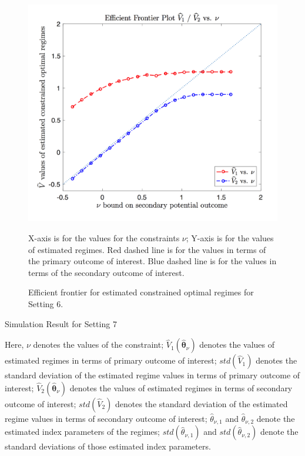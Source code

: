 \documentclass{article}
\newcommand{\wh}{\widehat}
\newcommand{\bs}{ \boldsymbol}
\begin{document}
\begin{appendices}
\begin{table}[!htbp]
\end{table} 
\begin{figure}[!htb]
	\centering
	\includegraphics[width=.9\linewidth]{./figs/efficient_plot6.png}
	\caption{Efficient frontier for estimated constrained optimal regimes for Setting 6.}
	\label{fig:6}
	\justify
X-axis is for the values for the constraints $\nu$; Y-axis is for the values of estimated regimes. Red dashed line is for the values in terms of the primary outcome of interest. Blue dashed line is for the values in terms of the secondary outcome of interest.
\end{figure}
\begin{table}[!htbp]
	\caption {Simulation Result for Setting 7}
	\centering
	{\tt
		
	}
	\justify
	Here, $\nu$ denotes the values of the constraint; $\wh{V}_1(\wh{\bs{\theta}}_{\nu})$ denotes the values of estimated regimes in terms of primary outcome of interest; $std(\wh{V}_1)$ denotes the standard deviation of the estimated regime values in terms of primary outcome of interest; $\wh{V}_2(\wh{\bs{\theta}}_{\nu})$ denotes the values of estimated regimes in terms of secondary outcome of interest; $std(\wh{V}_2)$ denotes the standard deviation of the estimated regime values in terms of secondary outcome of interest; $\wh{\theta}_{\nu,1}$ and $\wh{\theta}_{\nu,2}$ denote the estimated index parameters of the regimes; $std(\wh{\theta}_{\nu,1})$ and $std(\wh{\theta}_{\nu,2})$ denote the standard deviations of those estimated index parameters.	
\end{table} 
\begin{figure}[!htb]

\end{figure}
\end{appendices}
\end{document}
